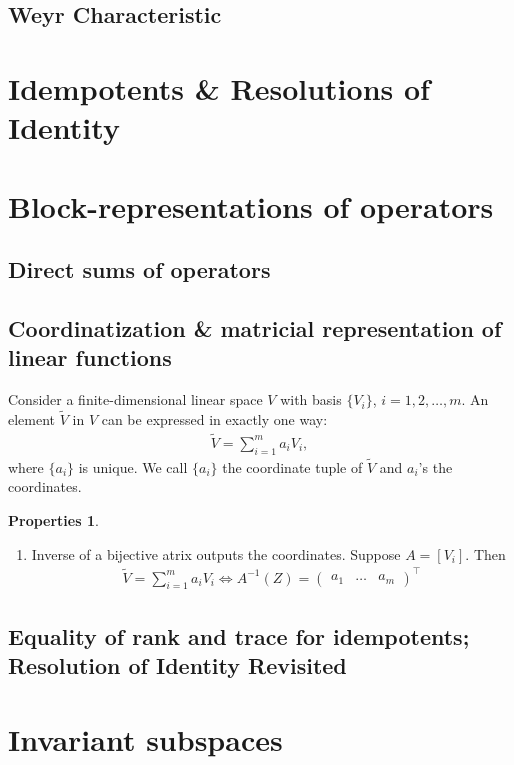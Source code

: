 \documentclass{article}
\theoremstyle{definition}
\newtheorem{prop}{Properties}[section]
\begin{document}
\subsection{Weyr Characteristic}

\newpage
\section{Idempotents \& Resolutions of Identity}




\newpage
\section{Block-representations of operators}
\subsection{Direct sums of operators}
\subsection{Coordinatization \& matricial representation of linear functions}
Consider a finite-dimensional linear space $V$ with basis $\{V_i \}$, $i=1,2,\dots,m$. An element $\tilde{V}$ in $V$ can be expressed in exactly one way:
\begin{align*}
\tilde{V} = \sum_{i=1}^m a_iV_i,
\end{align*}
where $\{ a_i\}$ is unique. We call $\{ a_i \}$ the coordinate tuple of $\tilde{V}$ and $a_i$'s the coordinates. 
\begin{prop}
	$\,$
	\begin{enumerate}
		\item Inverse of a bijective atrix outputs the coordinates. Suppose $A = [V_i]$. Then
		\begin{align*}
		\tilde{V} = \sum_{i=1}^ma_iV_i \iff A^{-1}(Z) = \begin{pmatrix}
		a_1&\dots&a_m
		\end{pmatrix}^\top
		\end{align*}
	\end{enumerate}
\end{prop}
\subsection{Equality of rank and trace for idempotents; Resolution of Identity Revisited}



\newpage
\section{Invariant subspaces}
\end{document}
